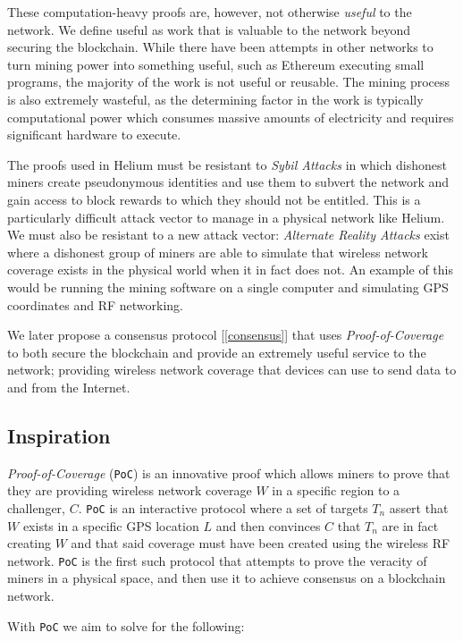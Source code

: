 \documentclass[UTF8, 10pt, nonatbib, nocopyrightspace, reprint]{sigplanconf}
\newcommand{\secref}[1]{[\autoref{#1}]}
\begin{document}
These computation-heavy proofs are, however, not otherwise \emph{useful} to the network. We define useful as work that is valuable to the network beyond securing the blockchain. While there have been attempts in other networks to turn mining power into something useful, such as Ethereum executing small programs, the majority of the work is not useful or reusable. The mining process is also extremely wasteful, as the determining factor in the work is typically computational power which consumes massive amounts of electricity and requires significant hardware to execute.

The proofs used in Helium must be resistant to \emph{Sybil Attacks} in which dishonest miners create pseudonymous identities and use them to subvert the network and gain access to block rewards to which they should not be entitled. This is a particularly difficult attack vector to manage in a physical network like Helium. We must also be resistant to a new attack vector: \emph{Alternate Reality Attacks} exist where a dishonest group of miners are able to simulate that wireless network coverage exists in the physical world when it in fact does not. An example of this would be running the mining software on a single computer and simulating GPS coordinates and RF networking.

We later propose a consensus protocol \secref{consensus} that uses \emph{Proof-of-Coverage} to both secure the blockchain and provide an extremely useful service to the network; providing wireless network coverage that devices can use to send data to and from the Internet.

\subsection{Inspiration}

\emph{Proof-of-Coverage} (\verb|PoC|) is an innovative proof which allows miners to prove that they are providing wireless network coverage $W$ in a specific region to a challenger, $C$. \verb|PoC| is an interactive protocol where a set of targets $T_n$ assert that $W$ exists in a specific GPS location $L$ and then convinces $C$ that $T_n$ are in fact creating $W$ and that said coverage must have been created using the wireless RF network. \verb|PoC| is the first such protocol that attempts to prove the veracity of miners in a physical space, and then use it to achieve consensus on a blockchain network.

With \verb|PoC| we aim to solve for the following:
\end{document}
